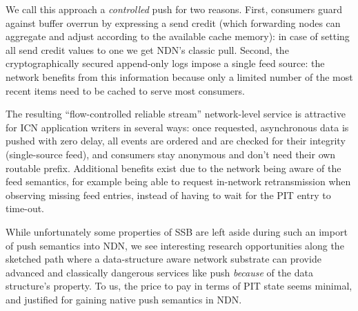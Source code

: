 \documentclass[9pt,sigconf]{acmart}
\begin{document}

We call this approach a \textit{controlled} push for two reasons. First, consumers guard
against buffer overrun by expressing a send credit (which forwarding
nodes can aggregate and adjust according to the available cache
memory): in case of setting all send credit values to one we get NDN's
classic pull. Second, the cryptographically secured append-only logs
impose a single feed source: the network benefits from this
information because only a limited number of the most recent items
need to be cached to serve most consumers.

The resulting ``flow-controlled reliable stream'' network-level
service is attractive for ICN application writers in several ways:
once requested, asynchronous data is pushed with zero delay, all
events are ordered and are checked for their integrity (single-source
feed), and consumers stay anonymous and don't need their own routable
prefix. Additional benefits exist due to the network being aware of
the feed semantics, for example being able to request in-network
retransmission when observing missing feed entries, instead of having
to wait for the PIT entry to time-out.

While unfortunately some properties of SSB are left aside during such an
import of push semantics into NDN, we see interesting research
opportunities along the sketched path where a data-structure aware
network substrate can provide advanced and classically dangerous
services like push {\em because} of the data structure's property. To
us, the price to pay in terms of PIT state seems minimal, and
justified for gaining native push semantics in NDN.



\end{document}
